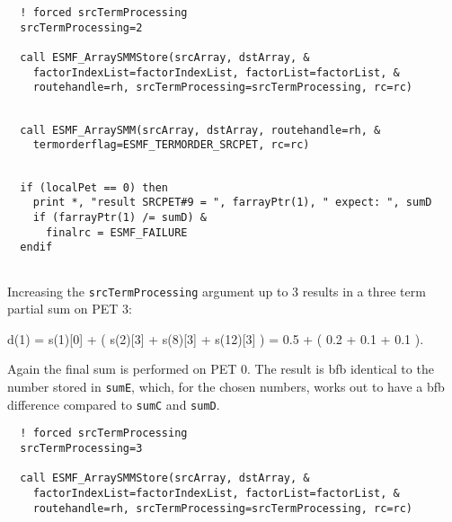  \begin{verbatim}
  ! forced srcTermProcessing
  srcTermProcessing=2
  
  call ESMF_ArraySMMStore(srcArray, dstArray, &
    factorIndexList=factorIndexList, factorList=factorList, &
    routehandle=rh, srcTermProcessing=srcTermProcessing, rc=rc)
 
\end{verbatim}
 

 \begin{verbatim}
  call ESMF_ArraySMM(srcArray, dstArray, routehandle=rh, &
    termorderflag=ESMF_TERMORDER_SRCPET, rc=rc)
 
\end{verbatim}
 

 \begin{verbatim}
  if (localPet == 0) then
    print *, "result SRCPET#9 = ", farrayPtr(1), " expect: ", sumD
    if (farrayPtr(1) /= sumD) &
      finalrc = ESMF_FAILURE
  endif
 
\end{verbatim}
 

   Increasing the {\tt srcTermProcessing} argument up to 3 results in a three
   term partial sum on PET 3:
  
       d(1) = s(1)[0] + ( s(2)[3] + s(8)[3] + s(12)[3] )
            = 0.5 + ( 0.2 + 0.1 + 0.1 ).
  
   Again the final sum is performed on PET 0. The result is bfb identical to
   the number stored in {\tt sumE}, which, for the chosen numbers, works out to
   have a bfb difference compared to {\tt sumC} and {\tt sumD}. 

 \begin{verbatim}
  ! forced srcTermProcessing
  srcTermProcessing=3
  
  call ESMF_ArraySMMStore(srcArray, dstArray, &
    factorIndexList=factorIndexList, factorList=factorList, &
    routehandle=rh, srcTermProcessing=srcTermProcessing, rc=rc)
 
\end{verbatim}
 

